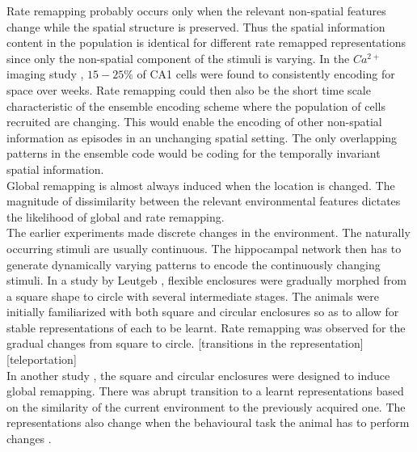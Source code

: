 Rate remapping probably occurs only when the relevant non-spatial features change while the spatial structure is preserved. Thus the spatial information content in the population is identical for different rate remapped representations since only the non-spatial component of the stimuli is varying. In the $Ca^{2+}$ imaging study \cite{Ziv2013}, $15-25 \% $ of CA1 cells were found to consistently encoding for space over weeks. Rate remapping could then also be the short time scale characteristic of the ensemble encoding scheme where the population of cells recruited are changing. This would enable the encoding of other non-spatial information as episodes in an unchanging spatial setting. The only overlapping patterns in the ensemble code would be coding for the temporally invariant spatial information. \\
Global remapping is almost always induced when the location is changed. The magnitude of dissimilarity between the relevant environmental features dictates the likelihood of global and rate remapping. \\
The earlier experiments made discrete changes in the environment. The naturally occurring stimuli are usually continuous. The hippocampal network then has to generate dynamically varying patterns to encode the continuously changing stimuli. In a study by Leutgeb \cite{Leutgeb2005}, flexible enclosures were gradually morphed from a square shape to circle with several intermediate stages. The animals were initially familiarized with both square and circular enclosures so as to allow for stable representations of each to be learnt. Rate remapping was observed for the gradual changes from square to circle.  [transitions in the representation] [teleportation]\\
In another study \cite{Wills2005}, the square and circular enclosures were designed to induce global remapping. There was abrupt transition to a learnt representations based on the similarity of the current environment to the previously acquired one. The representations also change when the behavioural task the animal has to perform changes \cite{Markus1995}. \\

